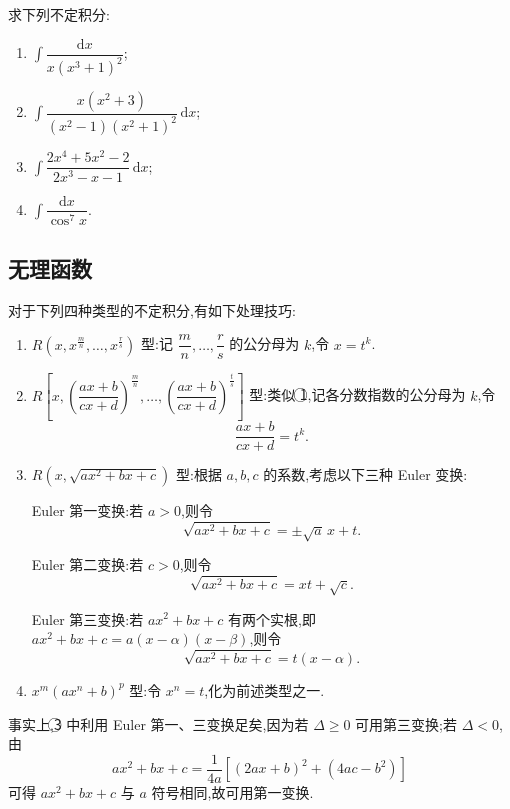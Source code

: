 \documentclass[../数学分析培优讲义.tex]{subfiles}
\begin{document}
\begin{example}
求下列不定积分:
\begin{enumerate}[label=(\arabic*)]
    \item $\displaystyle\int\dfrac{\mathrm{d}x}{x(x^3+1)^2}$;
    \item $\displaystyle\int\dfrac{x(x^2+3)}{(x^2-1)(x^2+1)^2}\,\mathrm{d}x$;
    \item $\displaystyle\int\dfrac{2x^4+5x^2-2}{2x^3-x-1}\,\mathrm{d}x$;
    \item $\displaystyle\int\dfrac{\mathrm{d}x}{\cos^7x}$.
\end{enumerate}
\end{example}
\exampleblank


\newpage

\subsection{无理函数}

\begin{proposition}[\markstar]
对于下列四种类型的不定积分,有如下处理技巧:
\begin{enumerate}[label=\textcircled{\arabic*}]
    \item $R\left(x,x^{\frac{m}{n}},\ldots,x^{\frac{r}{s}}\right)$ 型:记 $\dfrac{m}{n},\ldots,\dfrac{r}{s}$ 的公分母为 $k$,令 $x=t^k$.
    \item $R\left[x,\left(\dfrac{ax+b}{cx+d}\right)^{\frac{m}{n}},\ldots,
    \left(\dfrac{ax+b}{cx+d}\right)^{\frac{t}{s}}\right]$ 型:类似 \textcircled{1},记各分数指数的公分母为 $k$,令
    \[
        \dfrac{ax+b}{cx+d}=t^k.
    \]
    \item $R(x,\sqrt{ax^2+bx+c})$ 型:根据 $a,b,c$ 的系数,考虑以下三种 Euler 变换:

    Euler 第一变换:若 $a>0$,则令
    \[
        \sqrt{ax^2+bx+c}=\pm\sqrt{a}\,x+t.
    \]

    Euler 第二变换:若 $c>0$,则令
    \[
        \sqrt{ax^2+bx+c}=xt+\sqrt{c}.
    \]

    Euler 第三变换:若 $ax^2+bx+c$ 有两个实根,即 $ax^2+bx+c=a(x-\alpha)(x-\beta)$,则令
    \[
        \sqrt{ax^2+bx+c}=t(x-\alpha).
    \]
    \item $x^m(ax^n+b)^p$ 型:令 $x^n=t$,化为前述类型之一.
\end{enumerate}
\end{proposition}

\begin{remark}
事实上,\textcircled{3} 中利用 Euler 第一、三变换足矣,因为若 $\Delta\geq0$ 可用第三变换;若 $\Delta<0$,由
\[
    ax^2+bx+c=\dfrac{1}{4a}\left[(2ax+b)^2+(4ac-b^2)\right]
\]
可得 $ax^2+bx+c$ 与 $a$ 符号相同,故可用第一变换.
\end{remark}
\end{document}

